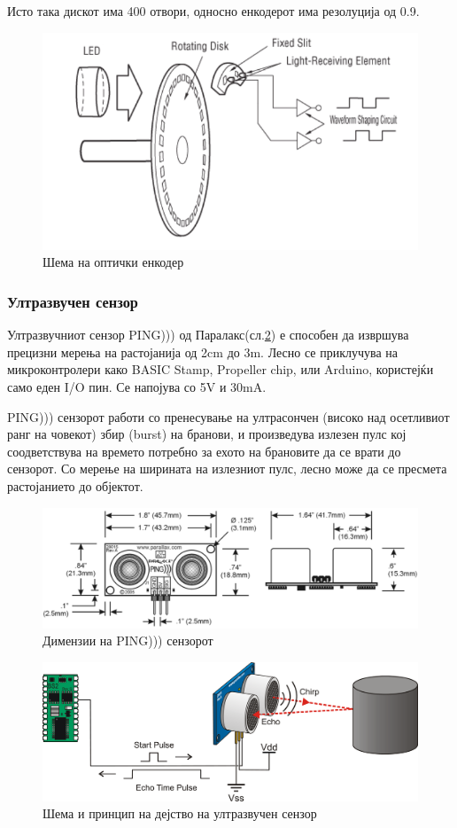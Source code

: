 \documentclass[12pt]{article}
\begin{document}
      Исто така дискот има 400 отвори, односно енкодерот има резолуција од 0.9\degree.

      \begin{figure}[H]
        \includegraphics[width=0.5\linewidth]{./images/encoder.png}
        \centering
        \caption{Шема на оптички енкодер}
        \label{fig:encoder.png}
        \end{figure}

    \subsubsection{Ултразвучен сензор}
      Ултразвучниот сензор PING))) од Паралакс(сл.\ref{fig:ping_dims.png}) е способен да извршува прецизни мерења на растојанија од 2cm до 3m. Лесно се приклучува на микроконтролери како BASIC Stamp, Propeller chip, или Arduino, користејќи само еден I/O пин. Се напојува со 5V и 30mA.

		  PING))) сензорот работи со пренесување на ултрасончен (високо над осетливиот ранг на човекот) збир (burst) на бранови, и произведува излезен пулс кој соодветствува на времето потребно за ехото на брановите да се врати до сензорот. Со мерење на ширината на излезниот пулс, лесно може да се пресмета растојанието до објектот.

		  \begin{figure}[H]
        \includegraphics[width=0.75\linewidth]{./images/ping_dims.png}
        \centering
        \caption{Димензии на PING))) сензорот}
        \label{fig:ping_dims.png}
        \end{figure}

      \begin{figure}[H]
        \includegraphics[width=0.75\linewidth]{./images/ping.png}
        \centering
        \caption{Шема и принцип на дејство на ултразвучен сензор}
        \label{fig:ping.png}
        \end{figure}
\end{document}
